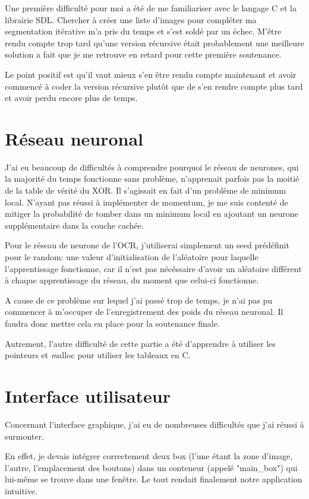 \documentclass[12pt]{report}
\begin{document}
Une première difficulté pour moi a été de me familiariser avec le langage C et la librairie SDL. Chercher à créer une liste d'images pour compléter ma segmentation itérative m'a pris du temps et s'est soldé par un échec. M'être rendu compte trop tard qu'une version récursive était probablement une meilleure solution a fait que je me retrouve en retard pour cette première soutenance.

Le point positif est qu'il vaut mieux s'en être rendu compte maintenant et avoir commencé à coder la version récursive plutôt que de s'en rendre compte plus tard et avoir perdu encore plus de temps.

\section*{Réseau neuronal}

J'ai eu beaucoup de difficultés à comprendre pourquoi le réseau de neurones, qui la majorité du temps fonctionne sans problème, n'apprenait parfois pas la moitié de la table de vérité du XOR. Il s'agissait en fait d'un problème de minimum local. N'ayant pas réussi à implémenter de momentum, je me suis contenté de mitiger la probabilité de tomber dans un minimum local en ajoutant un neurone supplémentaire dans la couche cachée.

Pour le réseau de neurone de l'OCR, j'utiliserai simplement un seed prédéfinit pour le random: une valeur d'initialisation de l'aléatoire pour laquelle l'apprentissage fonctionne, car il n'est pas nécéssaire d'avoir un aléatoire différent à chaque apprentissage du réseau, du moment que celui-ci fonctionne.

A cause de ce problème sur lequel j'ai passé trop de temps, je n'ai pas pu commencer à m'occuper de l'enregistrement des poids du réseau neuronal. Il faudra donc mettre cela en place pour la soutenance finale.

Autrement, l'autre difficulté de cette partie a été d'apprendre à utiliser les pointeurs et \textit malloc pour utiliser les tableaux en C.

\section*{Interface utilisateur}

Concernant l’interface graphique, j’ai eu de nombreuses difficultés que j’ai réussi à surmonter. 

En effet, je devais intégrer correctement deux box (l’une étant la zone d’image, l’autre, l’emplacement des boutons) dans un conteneur (appelé "main\_box") qui lui-même se trouve dans une fenêtre. Le tout rendait finalement notre application intuitive.
\end{document}

